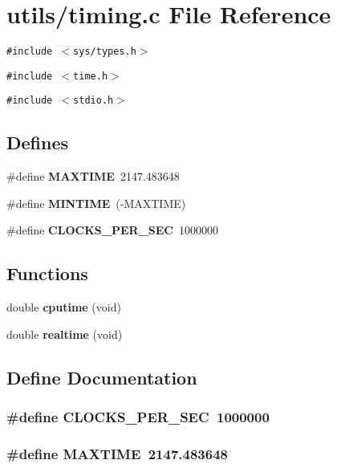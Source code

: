 \section{utils/timing.c File Reference}
\label{timing_8c}
{\tt \#include $<$sys/types.h$>$}\par
{\tt \#include $<$time.h$>$}\par
{\tt \#include $<$stdio.h$>$}\par
\subsection*{Defines}
\begin{CompactItemize}
\item 
\#define {\bf MAXTIME}~2147.483648
\item 
\#define {\bf MINTIME}~(-MAXTIME)
\item 
\#define {\bf CLOCKS\_\-PER\_\-SEC}~1000000
\end{CompactItemize}
\subsection*{Functions}
\begin{CompactItemize}
\item 
double {\bf cputime} (void)
\item 
double {\bf realtime} (void)
\end{CompactItemize}


\subsection{Define Documentation}
\subsubsection{\setlength{\rightskip}{0pt plus 5cm}\#define CLOCKS\_\-PER\_\-SEC~1000000}\label{timing_8c_3d9fc3c745d0880902fe3ea3d5d5f71e}


\subsubsection{\setlength{\rightskip}{0pt plus 5cm}\#define MAXTIME~2147.483648}\label{timing_8c_e583bedb01edb77ee6ceb98e847969cb}


